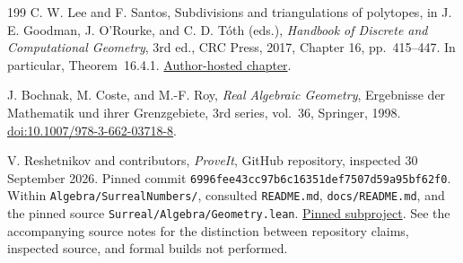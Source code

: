 \documentclass[11pt,a4paper]{article}
\numberwithin{equation}{section}
\theoremstyle{plain}
\newcommand{\snapshot}{6996fee43cc97b6c16351def7507d59a95bf62f0}
\newcounter{polybibc}
\newenvironment{polybiblist}[1]{\let\section\subsection\renewcommand{\refname}{#1}%
 \begin{thebibliography}{199}\setcounter{enumiv}{\value{polybibc}}}%
 {\setcounter{polybibc}{\value{enumiv}}\end{thebibliography}}
\begin{document}
\begin{polybiblist}{Parts I and II (manuscripts 05 and 02)}
C. W. Lee and F. Santos,
Subdivisions and triangulations of polytopes,
in J. E. Goodman, J. O'Rourke, and C. D. T\'oth (eds.),
\emph{Handbook of Discrete and Computational Geometry},
3rd ed., CRC Press, 2017, Chapter 16, pp.~415--447.
In particular, Theorem~16.4.1.
\href{https://www.csun.edu/~ctoth/Handbook/chap16.pdf}{Author-hosted chapter}.

J. Bochnak, M. Coste, and M.-F. Roy,
\emph{Real Algebraic Geometry},
Ergebnisse der Mathematik und ihrer Grenzgebiete, 3rd series, vol.~36,
Springer, 1998.
\href{https://doi.org/10.1007/978-3-662-03718-8}{doi:10.1007/978-3-662-03718-8}.

V. Reshetnikov and contributors,
\emph{ProveIt}, GitHub repository, inspected 30 September 2026.
Pinned commit \texttt{\snapshot}.
Within \texttt{Algebra/SurrealNumbers/}, consulted
\texttt{README.md}, \texttt{docs/README.md}, and the pinned source
\texttt{Surreal/Algebra/Geometry.lean}.
\href{https://github.com/VladimirReshetnikov/ProveIt/tree/6996fee43cc97b6c16351def7507d59a95bf62f0/Algebra/SurrealNumbers}{Pinned subproject}.
See the accompanying source notes for the distinction between repository
claims, inspected source, and formal builds not performed.

\end{polybiblist}
\end{document}

